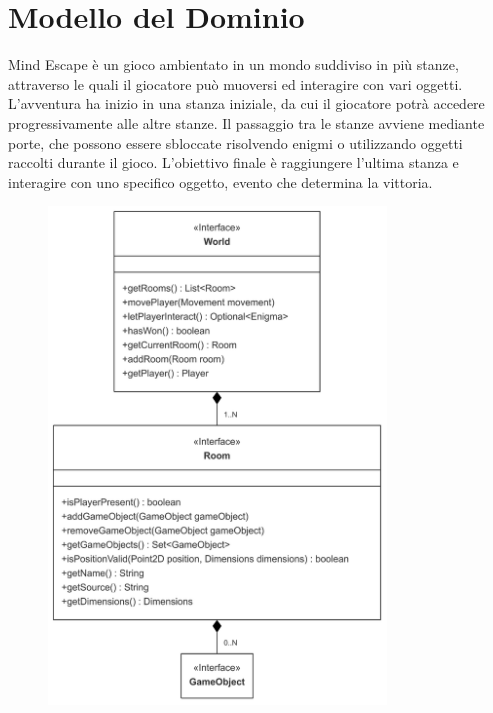 \documentclass[a4paper,12pt]{report}
\begin{document}
\section{Modello del Dominio}

Mind Escape è un gioco ambientato in un mondo suddiviso in più stanze, attraverso le quali il giocatore può muoversi ed interagire con vari oggetti. 
L’avventura ha inizio in una stanza iniziale, da cui il giocatore potrà accedere progressivamente alle altre stanze. 
Il passaggio tra le stanze avviene mediante porte, che possono essere sbloccate risolvendo enigmi o utilizzando oggetti raccolti durante il gioco. L'obiettivo finale è raggiungere l’ultima stanza e interagire con uno specifico oggetto, evento che determina la vittoria.

\begin{figure}[h]  %
    \centering
    \includegraphics[width=0.8\textwidth]{img/model.png}  %
    \label{img:gameObject}
\end{figure}
\end{document}
